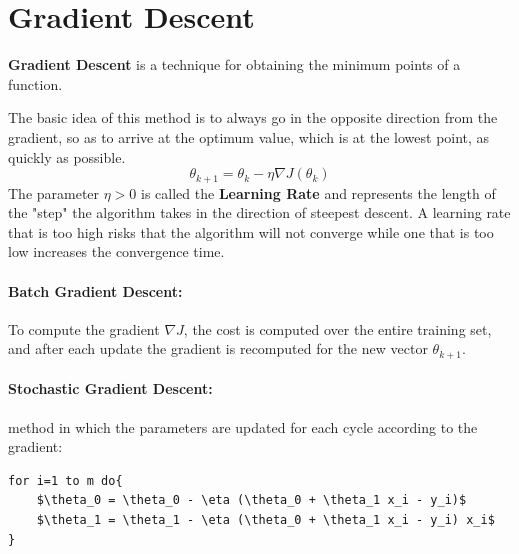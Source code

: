 \section{Gradient Descent}

\begin{mdframed}
    \textbf{Gradient Descent} is a technique for obtaining the minimum points of a function.
\end{mdframed}
 The basic idea of this method is to always go in the opposite direction from the gradient, so as to arrive at the optimum value, which is at the lowest point, as quickly as possible.
\begin{equation} \tag{Gradient Descent}
    \theta_{k+1} = \theta_k - \eta \nabla J(\theta_k)
\end{equation}
The parameter $\eta>0$ is called the \textbf{Learning Rate} and represents the length of the "step" the algorithm takes in the direction of steepest descent.
A learning rate that is too high risks that the algorithm will not converge while one that is too low increases the convergence time.
\paragraph{Batch Gradient Descent:} To compute the gradient $\nabla J$, the cost is computed over the entire training set, and after each update the gradient is recomputed for the new vector $\theta_{k+1}$.
\paragraph{Stochastic Gradient Descent:} method in which the parameters are updated for each cycle according to the gradient:
\begin{lstlisting}[mathescape=true]
for i=1 to m do{
    $\theta_0 = \theta_0 - \eta (\theta_0 + \theta_1 x_i - y_i)$
    $\theta_1 = \theta_1 - \eta (\theta_0 + \theta_1 x_i - y_i) x_i$
}
\end{lstlisting}

